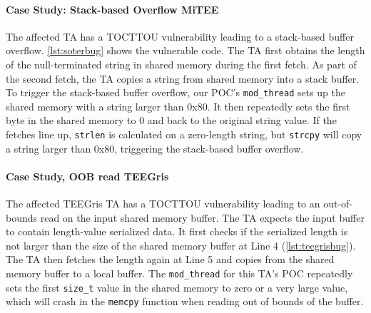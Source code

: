 \documentclass[conference]{IEEEtran} %
\newcommand{\mitee}{MiTEE\xspace}
\newcommand{\teegris}{TEEGris\xspace}
\begin{document}
\paragraph{Case Study: Stack-based Overflow \mitee}

\begin{listing}[h]
    
    \label{lst:soterbug}
\end{listing}

The affected TA has a TOCTTOU vulnerability 
leading to a stack-based buffer overflow. \autoref{lst:soterbug} shows the vulnerable code. 
The TA first obtains the length of the null-terminated string in shared memory during the first 
fetch. As part of the second fetch, the TA copies a string from shared memory into a stack buffer. 
To trigger the stack-based buffer overflow, our POC's \texttt{mod\_thread} sets up the shared 
memory with a string larger than 0x80. It then repeatedly sets the 
first byte in the shared memory to 0 and back to the original string value. If the fetches 
line up, \texttt{strlen} is calculated on a zero-length string, but \texttt{strcpy} will 
copy a string larger than 0x80, triggering the stack-based buffer overflow.

\paragraph{Case Study, OOB read \teegris}

\begin{listing}[h]
    
    \label{lst:teegrisbug}
\end{listing}

The affected \teegris TA has a TOCTTOU vulnerability leading to an out-of-bounds read on the 
input shared memory buffer. The TA expects the input buffer to contain length-value 
serialized data. It first checks if the 
serialized length is not larger than the size of the shared memory buffer at Line 4 (\autoref{lst:teegrisbug}).
The TA then fetches the length again at Line 5 and copies from the shared memory buffer to 
a local buffer. The \texttt{mod\_thread} for this TA's POC repeatedly sets the 
first \texttt{size\_t} value in the shared memory to zero or a very large value, 
which will crash in the \texttt{memcpy} function when reading out of bounds of the buffer.
\end{document}
